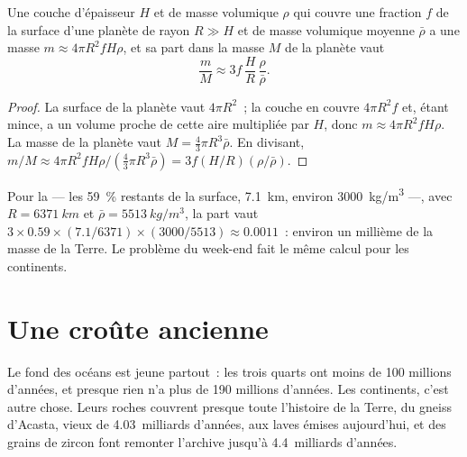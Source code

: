 \begin{proposition}\label{prop:g12:continental-crust:thin-layer}
Une couche d'épaisseur $H$ et de masse volumique $\rho$ qui couvre une
fraction $f$ de la surface d'une planète de rayon $R \gg H$ et de masse
volumique moyenne $\bar\rho$ a une masse $m \approx 4\pi R^2 f H \rho$, et
sa part dans la masse $M$ de la planète vaut
\[
  \frac{m}{M} \approx 3 f\,\frac{H}{R}\,\frac{\rho}{\bar\rho}.
\]
\end{proposition}

\begin{proof}
La surface de la planète vaut $4\pi R^2$~; la couche en couvre
$4\pi R^2 f$ et, étant mince, a un volume proche de cette aire multipliée
par $H$, donc $m \approx 4\pi R^2
f H \rho$. La masse de la planète vaut
$M = \tfrac{4}{3}\pi R^3 \bar\rho$. En divisant,
$m/M \approx 4\pi R^2 f H \rho / (\tfrac{4}{3}\pi R^3 \bar\rho) = 3 f (H/R)
(\rho/\bar\rho)$.
\end{proof}

Pour la  --- les \qty{59}{\percent} restants de la surface,
\qty{7.1}{km}, environ \qty{3000}{kg/m^3} ---, avec $R = \qty{6371}{km}$ et
$\bar\rho = \qty{5513}{kg/m^3}$, la part vaut $3 \times 0.59 \times
(7.1/6371) \times (3000/5513) \approx 0.0011$~:
environ un millième de la masse de la Terre. Le problème du week-end fait
le même calcul pour les continents.

\section{Une croûte ancienne}

Le fond des océans est jeune partout~: les trois quarts ont moins de 100
millions d'années, et presque rien n'a plus de 190 millions d'années. Les
continents, c'est autre chose. Leurs roches couvrent presque toute
l'histoire de la Terre, du gneiss d'Acasta, vieux de 4.03~milliards
d'années, aux laves émises aujourd'hui, et des grains de zircon font
remonter l'archive jusqu'à 4.4~milliards d'années.

